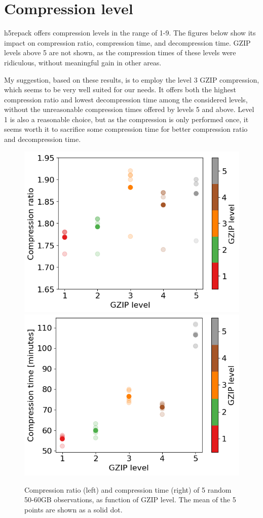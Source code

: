 \documentclass[10pt, a4paper]{article}
\begin{document}
\section*{Compression level}
h5repack offers compression levels in the range of 1-9. The figures below show its impact on compression ratio, compression time, and decompression time. GZIP levels above 5 are not shown, as the compression times of these levels were ridiculous, without meaningful gain in other areas.

My suggestion, based on these results, is to employ the level 3 GZIP compression, which seems to be very well suited for our needs. It offers both the highest compression ratio and lowest decompression time among the considered levels, without the unreasonable compression times offered by levels 5 and above. Level 1 is also a reasonable choice, but as the compression is only performed once, it seems worth it to sacrifice some compression time for better compression ratio and decompression time.

\begin{figure}[H]
    \centering
    \includegraphics[scale=0.55]{gzip_compratio.png}
    \includegraphics[scale=0.55]{gzip_comptime.png}
    \caption{Compression ratio (left) and compression time (right) of 5 random 50-60GB observations, as function of GZIP level. The mean of the 5 points are shown as a solid dot.}
    \label{fig:fig1}
\end{figure}
\end{document}
